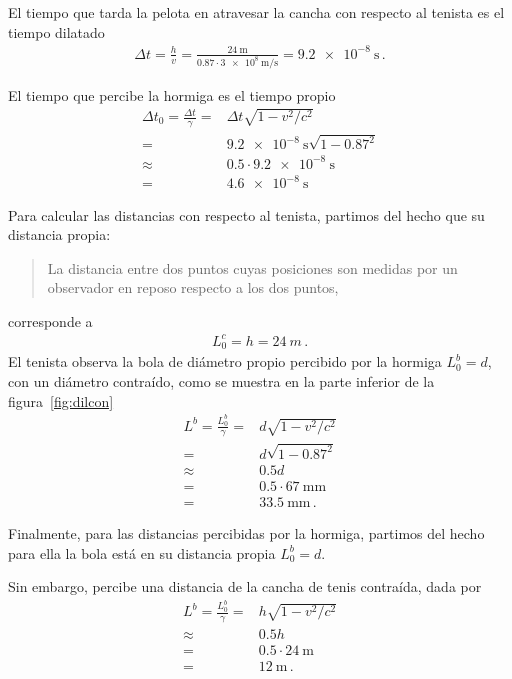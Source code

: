 \documentclass[11pt,a4paper]{article}
\begin{document}
\begin{enumerate}
El tiempo que tarda la pelota en atravesar la cancha con respecto al tenista es el tiempo dilatado
\begin{align}
    \Delta t = \frac{h}{v} = \frac{\qty{24}{\m}}{0.87\cdot \qty{3e8}{\m/\s}} = \qty{9.2e-8}{\s}\,.
\end{align}

El tiempo que percibe la hormiga es el tiempo propio
\begin{align}
    \Delta t_0 = \frac{\Delta t}{\gamma} =& \Delta t \sqrt{1-v^2/c^2} \nonumber\\
    =& \qty{9.2e-8}{\s} \sqrt{1-0.87^2} \nonumber\\
 \approx &0.5\cdot \qty{9.2e-8}{\s} \nonumber\\
    =& \qty{4.6e-8}{\s}
\end{align}

Para calcular las distancias con respecto al tenista, partimos del hecho que su distancia propia:
\begin{quote}
    La distancia entre dos puntos cuyas posiciones son medidas por
un observador en reposo respecto a los dos puntos,
\end{quote}
corresponde a 
\begin{align*}
    L_0^{c} = h = \qty{24}{m}\,.
\end{align*}
El tenista observa la bola de diámetro propio percibido por la hormiga $L^b_0 = d$, con un diámetro contraído, como se muestra en la parte inferior de la figura~\ref{fig:dilcon}
\begin{align*}
    L^b = \frac{L^b_0}{\gamma} =& d \sqrt{1-v^2/c^2} \\
        =& d\sqrt{1-0.87^2}\\
        \approx& 0.5d\\
    =& 0.5\cdot \qty{67}{\milli\m}\\
    =& \qty{33.5}{\milli\m}\,.
\end{align*}

Finalmente, para las distancias percibidas por la hormiga, partimos del hecho para ella la bola está en su distancia propia $L^b_0 = d$.

Sin embargo, percibe una distancia de la cancha de tenis contraída, dada por
\begin{align*}
    L^{b} = \frac{L^b_0}{\gamma} =& h\sqrt{1-v^2/c^2}\\
    \approx& 0.5 h\\
        =& 0.5\cdot \qty{24}{\m}\\
    =& \qty{12}{\m}\,.
\end{align*}


\end{enumerate}
\end{document}
